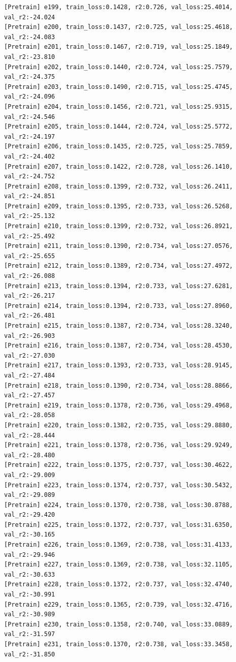\documentclass[a4paper, 12pt]{article}
\begin{document}
\begin{lstlisting}
[Pretrain] e199, train_loss:0.1428, r2:0.726, val_loss:25.4014, val_r2:-24.024
[Pretrain] e200, train_loss:0.1437, r2:0.725, val_loss:25.4618, val_r2:-24.083
[Pretrain] e201, train_loss:0.1467, r2:0.719, val_loss:25.1849, val_r2:-23.810
[Pretrain] e202, train_loss:0.1440, r2:0.724, val_loss:25.7579, val_r2:-24.375
[Pretrain] e203, train_loss:0.1490, r2:0.715, val_loss:25.4745, val_r2:-24.096
[Pretrain] e204, train_loss:0.1456, r2:0.721, val_loss:25.9315, val_r2:-24.546
[Pretrain] e205, train_loss:0.1444, r2:0.724, val_loss:25.5772, val_r2:-24.197
[Pretrain] e206, train_loss:0.1435, r2:0.725, val_loss:25.7859, val_r2:-24.402
[Pretrain] e207, train_loss:0.1422, r2:0.728, val_loss:26.1410, val_r2:-24.752
[Pretrain] e208, train_loss:0.1399, r2:0.732, val_loss:26.2411, val_r2:-24.851
[Pretrain] e209, train_loss:0.1395, r2:0.733, val_loss:26.5268, val_r2:-25.132
[Pretrain] e210, train_loss:0.1399, r2:0.732, val_loss:26.8921, val_r2:-25.492
[Pretrain] e211, train_loss:0.1390, r2:0.734, val_loss:27.0576, val_r2:-25.655
[Pretrain] e212, train_loss:0.1389, r2:0.734, val_loss:27.4972, val_r2:-26.088
[Pretrain] e213, train_loss:0.1394, r2:0.733, val_loss:27.6281, val_r2:-26.217
[Pretrain] e214, train_loss:0.1394, r2:0.733, val_loss:27.8960, val_r2:-26.481
[Pretrain] e215, train_loss:0.1387, r2:0.734, val_loss:28.3240, val_r2:-26.903
[Pretrain] e216, train_loss:0.1387, r2:0.734, val_loss:28.4530, val_r2:-27.030
[Pretrain] e217, train_loss:0.1393, r2:0.733, val_loss:28.9145, val_r2:-27.484
[Pretrain] e218, train_loss:0.1390, r2:0.734, val_loss:28.8866, val_r2:-27.457
[Pretrain] e219, train_loss:0.1378, r2:0.736, val_loss:29.4968, val_r2:-28.058
[Pretrain] e220, train_loss:0.1382, r2:0.735, val_loss:29.8880, val_r2:-28.444
[Pretrain] e221, train_loss:0.1378, r2:0.736, val_loss:29.9249, val_r2:-28.480
[Pretrain] e222, train_loss:0.1375, r2:0.737, val_loss:30.4622, val_r2:-29.009
[Pretrain] e223, train_loss:0.1374, r2:0.737, val_loss:30.5432, val_r2:-29.089
[Pretrain] e224, train_loss:0.1370, r2:0.738, val_loss:30.8788, val_r2:-29.420
[Pretrain] e225, train_loss:0.1372, r2:0.737, val_loss:31.6350, val_r2:-30.165
[Pretrain] e226, train_loss:0.1369, r2:0.738, val_loss:31.4133, val_r2:-29.946
[Pretrain] e227, train_loss:0.1369, r2:0.738, val_loss:32.1105, val_r2:-30.633
[Pretrain] e228, train_loss:0.1372, r2:0.737, val_loss:32.4740, val_r2:-30.991
[Pretrain] e229, train_loss:0.1365, r2:0.739, val_loss:32.4716, val_r2:-30.989
[Pretrain] e230, train_loss:0.1358, r2:0.740, val_loss:33.0889, val_r2:-31.597
[Pretrain] e231, train_loss:0.1370, r2:0.738, val_loss:33.3458, val_r2:-31.850

\end{lstlisting}
\end{document}
